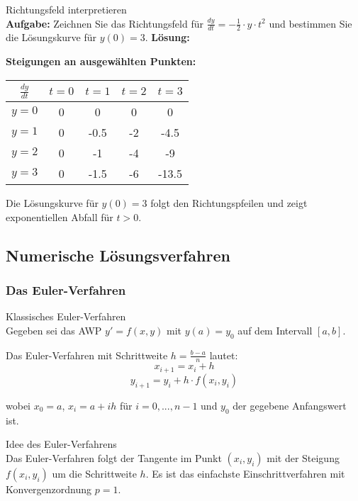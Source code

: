 \begin{example2}{Richtungsfeld interpretieren}\\
\textbf{Aufgabe:} Zeichnen Sie das Richtungsfeld für $\frac{dy}{dt} = -\frac{1}{2} \cdot y \cdot t^2$ und bestimmen Sie die Lösungskurve für $y(0) = 3$.
\tcblower
\textbf{Lösung:}

\textbf{Steigungen an ausgewählten Punkten:}
\begin{center}
\begin{tabular}{|c|c|c|c|c|}
\hline
$\frac{dy}{dt}$ & $t=0$ & $t=1$ & $t=2$ & $t=3$ \\
\hline
$y=0$ & 0 & 0 & 0 & 0 \\
\hline
$y=1$ & 0 & -0.5 & -2 & -4.5 \\
\hline
$y=2$ & 0 & -1 & -4 & -9 \\
\hline
$y=3$ & 0 & -1.5 & -6 & -13.5 \\
\hline
\end{tabular}
\end{center}

Die Lösungskurve für $y(0) = 3$ folgt den Richtungspfeilen und zeigt exponentiellen Abfall für $t > 0$.
\end{example2}

\raggedcolumns
\pagebreak

\subsection{Numerische Lösungsverfahren}

\subsubsection{Das Euler-Verfahren}

\begin{theorem}{Klassisches Euler-Verfahren}\\
Gegeben sei das AWP $y' = f(x,y)$ mit $y(a) = y_0$ auf dem Intervall $[a,b]$.

Das Euler-Verfahren mit Schrittweite $h = \frac{b-a}{n}$ lautet:
$$x_{i+1} = x_i + h$$
$$y_{i+1} = y_i + h \cdot f(x_i, y_i)$$

wobei $x_0 = a$, $x_i = a + ih$ für $i = 0, ..., n-1$ und $y_0$ der gegebene Anfangswert ist.
\end{theorem}

\begin{concept}{Idee des Euler-Verfahrens}\\
Das Euler-Verfahren folgt der Tangente im Punkt $(x_i, y_i)$ mit der Steigung $f(x_i, y_i)$ um die Schrittweite $h$. Es ist das einfachste Einschrittverfahren mit Konvergenzordnung $p = 1$.
\end{concept}

